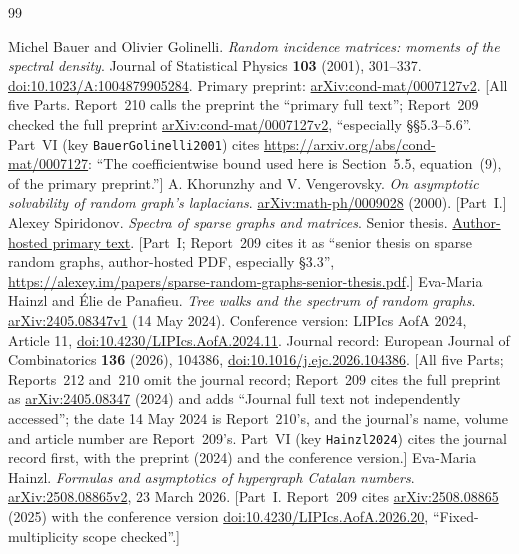 \documentclass[11pt,letterpaper]{article}
\theoremstyle{remark}\newtheorem{remark}[theorem]{Remark}
\theoremstyle{definition}\newtheorem{definition}[theorem]{Definition}
\begin{document}
\begin{thebibliography}{99}\raggedright
{} Michel Bauer and Olivier Golinelli.
\emph{Random incidence matrices: moments of the spectral density}.
Journal of Statistical Physics \textbf{103} (2001), 301--337.
\href{https://doi.org/10.1023/A:1004879905284}{doi:10.1023/A:1004879905284}.
Primary preprint: \href{https://arxiv.org/abs/cond-mat/0007127v2}{arXiv:cond-mat/0007127v2}.
[All five Parts. Report~210 calls the preprint the ``primary full text''; Report~209 checked the full preprint \href{https://arxiv.org/pdf/cond-mat/0007127v2}{arXiv:cond-mat/0007127v2}, ``especially \S\S5.3--5.6''. Part~VI (key \texttt{BauerGolinelli2001}) cites \url{https://arxiv.org/abs/cond-mat/0007127}: ``The coefficientwise bound used here is Section~5.5, equation~(9), of the primary preprint.'']
 A. Khorunzhy and V. Vengerovsky.
\emph{On asymptotic solvability of random graph's laplacians}.
\href{https://arxiv.org/abs/math-ph/0009028}{arXiv:math-ph/0009028} (2000). [Part~I.]
 Alexey Spiridonov.
\emph{Spectra of sparse graphs and matrices}. Senior thesis.
\href{https://alexey.im/papers/sparse-random-graphs-senior-thesis.pdf}{Author-hosted primary text}.
[Part~I; Report~209 cites it as ``senior thesis on sparse random graphs, author-hosted PDF, especially \S3.3'', \url{https://alexey.im/papers/sparse-random-graphs-senior-thesis.pdf}.]
 Eva-Maria Hainzl and \'Elie de Panafieu.
\emph{Tree walks and the spectrum of random graphs}.
\href{https://arxiv.org/abs/2405.08347v1}{arXiv:2405.08347v1} (14 May 2024).
Conference version: LIPIcs AofA 2024, Article 11, \href{https://doi.org/10.4230/LIPIcs.AofA.2024.11}{doi:10.4230/LIPIcs.AofA.2024.11}.
Journal record: European Journal of Combinatorics \textbf{136} (2026), 104386, \href{https://doi.org/10.1016/j.ejc.2026.104386}{doi:10.1016/j.ejc.2026.104386}.
[All five Parts; Reports~212 and~210 omit the journal record; Report~209 cites the full preprint as \href{https://arxiv.org/abs/2405.08347}{arXiv:2405.08347} (2024) and adds ``Journal full text not independently accessed''; the date 14 May 2024 is Report~210's, and the journal's name, volume and article number are Report~209's. Part~VI (key \texttt{Hainzl2024}) cites the journal record first, with the preprint (2024) and the conference version.]
 Eva-Maria Hainzl.
\emph{Formulas and asymptotics of hypergraph Catalan numbers}.
\href{https://arxiv.org/abs/2508.08865v2}{arXiv:2508.08865v2}, 23 March 2026.
[Part~I. Report~209 cites \href{https://arxiv.org/abs/2508.08865}{arXiv:2508.08865} (2025) with the conference version \href{https://doi.org/10.4230/LIPIcs.AofA.2026.20}{doi:10.4230/LIPIcs.AofA.2026.20}, ``Fixed-multiplicity scope checked''.]

\end{thebibliography}
\end{document}
